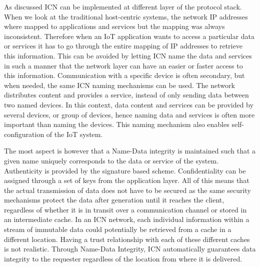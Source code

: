 As discussed ICN can be implemented at different layer of the protocol stack. When we look at the traditional host-centric systems, the network IP addresses where mapped to applications and services but the mapping was always inconsistent. Therefore when an IoT application wants to access a particular data or services it has to go through the entire mapping of IP addresses to retrieve this information. This can be avoided by letting ICN name the data and services in such a manner that the network layer can have an easier or faster access to this information. Communication with a specific device is often secondary, but when needed, the same ICN naming mechanisms can be used. The network distributes content and provides a service, instead of only sending data between two named devices. In this context, data content and services can be provided by several devices, or group of devices, hence naming data and services is often more important than naming the devices. This naming mechanism also enables self-configuration of the IoT system.\par
The most aspect is however that a Name-Data integrity is maintained such that a given name uniquely corresponds to the data or service of the system. Authenticity is provided by the signature based scheme. Confidentiality can be assigned through a set of keys from the application layer. All of this means that the actual transmission of data does not have to be secured as the same security mechanisms protect the data after generation until it reaches the client, regardless of whether it is in transit over a communication channel or stored in an intermediate cache. In an ICN network, each individual information within a stream of immutable data could potentially be retrieved from a cache in a different location. Having a trust relationship with each of these different caches is not realistic. Through Name-Data Integrity, ICN automatically guarantees data integrity to the requester regardless of the location from where it is delivered. 
